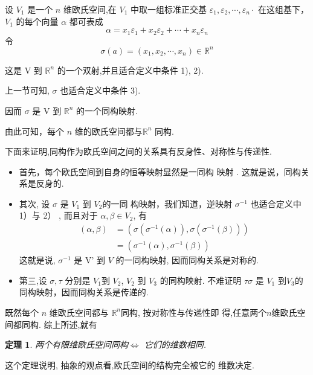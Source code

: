 \documentclass[13pt]{beamer}
\newtheorem{thm}{定理}
\begin{document}
\begin{frame}
设 $V_1$ 是一个 $n$ 维欧氏空间,在 $V_1$ 中取一组标准正交基 ${\varepsilon}_{1}, {\varepsilon}_{2}, \cdots, {\varepsilon}_{n} \cdot$ 在这组基下， $V_1$ 的每个向量 ${\alpha}$ 都可表成
\[
{\alpha}= {x}_{1} {\varepsilon}_{1}+x_{2} {{\varepsilon}}_{2}+\cdots+x_{n} {\varepsilon}_{n}
\]
令
\[
\sigma({a})=\left(x_{1}, x_{2}, \cdots, x_{n}\right) \in \mathbb{R}^n
\]

这是 V 到 $\mathbb{R}^n$ 的一个双射,并且适合定义中条件 1), 2).

上一节可知, $\sigma$ 也适合定义中条件 3).

因而 $\sigma$ 是 V 到 $\mathbb{R}^n$ 的一个同构映射.

由此可知，每个 $n$ 维的欧氏空间都与$\mathbb{R}^n$ 同构. 

\end{frame}


\begin{frame}
下面来证明,同构作为欧氏空间之间的关系具有反身性、对称性与传递性.

\begin{itemize}
\item  首先，每个欧氏空间到自身的恒等映射显然是一同构 映射 . 这就是说，同构关系是反身的.

\item 其次, 设 $\sigma$ 是 $V_1$ 到 $V_2$的一同 构映射，我们知道，逆映射 $\sigma^{-1}$ 也适合定义中 1）与 2） , 而且对于 ${\alpha}, {\beta} \in V_2$, 有
$$
\begin{aligned}
	({\alpha}, {\beta}) &=\left(\sigma\left(\sigma^{-1}({\alpha})\right), \sigma\left(\sigma^{-1}({\beta})\right)\right) \\
	&=\left(\sigma^{-1}({\alpha}), \sigma^{-1}({\beta})\right)
\end{aligned}
$$
这就是说, $\sigma^{-1}$ 是 V' 到 $V$ 的一同构映射, 因而同构关系是对称的. 

\item 第三,设 $\sigma, \tau$ 分别是 $V_1$到 $V_2$, $V_2$ 到 $V_3$ 的同构映射. 不难证明 $\tau \sigma$ 是 $V_1$ 到$V_3$的同构映射，因而同构关系是传递的.
\end{itemize}

\end{frame}


\begin{frame}

 既然每个 $n$ 维欧氏空间都与 $\mathbb{R}^n$同构, 按对称性与传递性即
得,任意两个$n$维欧氏空间都同构.
综上所述,就有 
\begin{thm}
两个有限维欧氏空间同构$\Leftrightarrow$ 它们的维数相同.
\end{thm}
这个定理说明, 抽象的观点看,欧氏空间的结构完全被它的 维数决定.

\end{frame}
\end{document}
